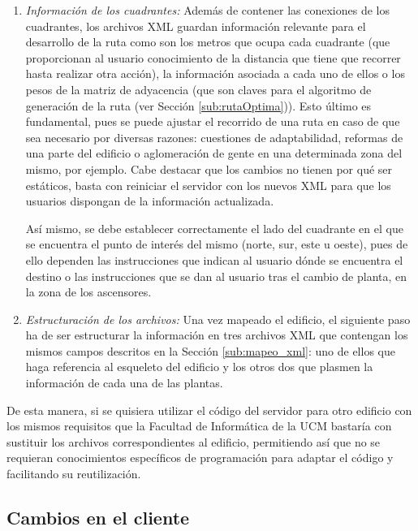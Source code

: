 \begin{enumerate}
	\item \textit{Información de los cuadrantes:} Además de contener las conexiones de los cuadrantes, los archivos XML guardan información relevante para el desarrollo de la ruta como son los metros que ocupa cada cuadrante (que proporcionan al usuario conocimiento de la distancia que tiene que recorrer hasta realizar otra acción), la información asociada a cada uno de ellos o los pesos de la matriz de adyacencia (que son claves para el algoritmo de generación de la ruta (ver Sección \ref{sub:rutaOptima})). Esto último es fundamental, pues se puede ajustar el recorrido de una ruta en caso de que sea necesario por diversas razones: cuestiones de adaptabilidad, reformas de una parte del edificio o aglomeración de gente en una determinada zona del mismo, por ejemplo. Cabe destacar que los cambios no tienen por qué ser estáticos, basta con reiniciar el servidor con los nuevos XML para que los usuarios dispongan de la información actualizada. 
	
	Así mismo, se debe establecer correctamente el lado del cuadrante en el que se encuentra el punto de interés del mismo (norte, sur, este u oeste), pues de ello dependen las instrucciones que indican al usuario dónde se encuentra el destino o las instrucciones que se dan al usuario tras el cambio de planta, en la zona de los ascensores.
	
	\item \textit{Estructuración de los archivos:} Una vez mapeado el edificio, el siguiente paso ha de ser estructurar la información en tres archivos XML que contengan los mismos campos descritos en la Sección \ref{sub:mapeo_xml}: uno de ellos que haga referencia al esqueleto del edificio y los otros dos que plasmen la información de cada una de las plantas.
	
\end{enumerate}

De esta manera, si se quisiera utilizar el código del servidor para otro edificio con los mismos requisitos que la Facultad de Informática de la UCM bastaría con sustituir los archivos correspondientes al edificio, permitiendo así que no se requieran conocimientos específicos de programación para adaptar el código y facilitando su reutilización.


\subsection{Cambios en el cliente}
\label{sub:cambiosCliente}

